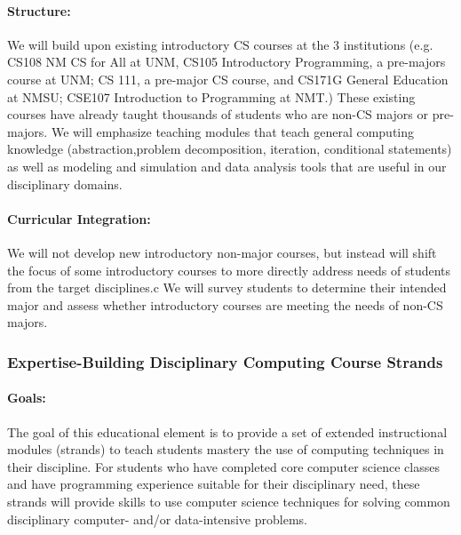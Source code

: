 \paragraph{Structure:} We will build upon existing introductory CS courses at the 3 institutions (e.g. CS108 NM CS for All at UNM, CS105 Introductory Programming, a pre-majors course at UNM; CS 111, a pre-major CS course, and CS171G General Education at NMSU; CSE107 Introduction to Programming at NMT.) These existing courses have already taught thousands of students who are non-CS majors or pre-majors. We will emphasize teaching modules that teach general computing knowledge (abstraction,problem decomposition, iteration, conditional statements) as well as modeling and simulation and data analysis tools that are useful in our disciplinary domains.

\paragraph{Curricular Integration:}
We will not develop new introductory non-major courses, but instead will shift the focus of some introductory courses to more directly address needs of students from the target disciplines.c We will survey students to determine their intended major and assess whether introductory courses are meeting the needs of non-CS majors.

\subsubsection{Expertise-Building Disciplinary Computing Course Strands}
\paragraph{Goals:} The goal of this educational element is to provide a set of extended instructional modules (strands) to teach students mastery the use of computing techniques in their discipline. For students who have completed core computer science classes and have programming experience suitable for their disciplinary need, these strands will provide skills to use computer science techniques for solving common disciplinary computer- and/or data-intensive problems. 

